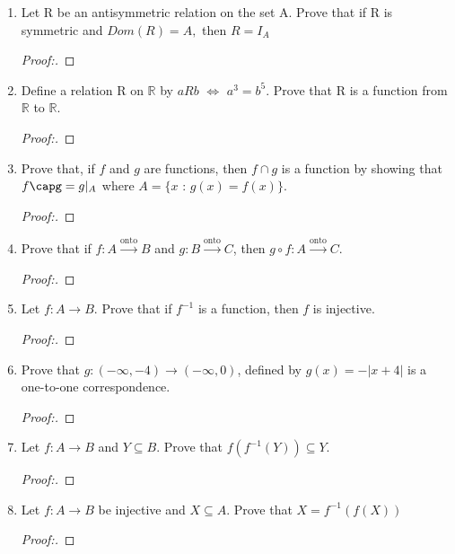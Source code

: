 \documentclass[11pt]{article}
\begin{document}
\begin{enumerate}
    \item Let R be an antisymmetric relation on the set A. 
    \newnline Prove that if R is symmetric and $Dom(R) = A,$ then $R=I_A$
       \begin{proof}[Proof:\nopunct]
        \end{proof}
        
    \item Define a relation R on $\mathbb{R}$ by $aRb$ $\iff$ $a^3=b^5$. Prove that R is a function from $\mathbb{R}$ to $\mathbb{R}.$
       \begin{proof}[Proof:\nopunct]
        \end{proof}
        
    \item Prove that, if $f$ and $g$ are functions, then $f \cap g$ is a function by showing that $f\capg = g|_{A}$ where \newline $A = \{x$ : $g(x) = f(x) \}.$
       \begin{proof}[Proof:\nopunct]
        \end{proof}
        
    \item Prove that if $f:A \xrightarrow{\text{onto}} B$ and $g:B\xrightarrow{\text{onto}} C$, then $g\circ f:A \xrightarrow{\text{onto}} C.$
        \begin{proof}[Proof:\nopunct]
        \end{proof}
        
    \item Let $f:A\xrightarrow{} B$. Prove that if $f^{-1}$ is a function, then $f$ is injective.
       \begin{proof}[Proof:\nopunct]
        \end{proof}
        
    \item Prove that $g:(-\infty, -4)\rightarrow(-\infty,0)$, defined by $g(x) = -|x+4|$ is a one-to-one correspondence.
       \begin{proof}[Proof:\nopunct]
        \end{proof}
        
    \item Let $f:A \rightarrow B$ and $Y \subseteq B.$ Prove that $f(f^{-1}(Y)) \subseteq Y.$
        \begin{proof}[Proof:\nopunct]
        \end{proof}
        
    \item Let $f:A \rightarrow B$ be injective and $X \subseteq A.$ \newline Prove that $X = f^{-1}(f(X))$ 
        \begin{proof}[Proof:\nopunct]
        \end{proof}
    
\end{enumerate}
\end{document}
